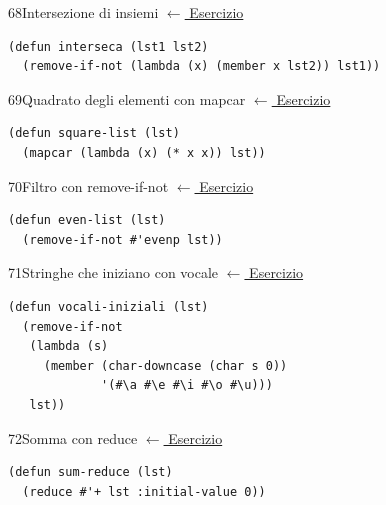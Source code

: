 \label{sol:68}
\begin{solbox}{68}{Intersezione di insiemi}
\small\color{black!55}\hyperref[ex:68]{$\leftarrow$ Esercizio}\normalsize\color{black}
\begin{lstlisting}
(defun interseca (lst1 lst2)
  (remove-if-not (lambda (x) (member x lst2)) lst1))
\end{lstlisting}
\end{solbox}


\label{sol:69}
\begin{solbox}{69}{Quadrato degli elementi con mapcar}
\small\color{black!55}\hyperref[ex:69]{$\leftarrow$ Esercizio}\normalsize\color{black}
\begin{lstlisting}
(defun square-list (lst)
  (mapcar (lambda (x) (* x x)) lst))
\end{lstlisting}
\end{solbox}

\label{sol:70}
\begin{solbox}{70}{Filtro con remove-if-not}
\small\color{black!55}\hyperref[ex:70]{$\leftarrow$ Esercizio}\normalsize\color{black}
\begin{lstlisting}
(defun even-list (lst)
  (remove-if-not #'evenp lst))
\end{lstlisting}
\end{solbox}

\label{sol:71}
\begin{solbox}{71}{Stringhe che iniziano con vocale}
\small\color{black!55}\hyperref[ex:71]{$\leftarrow$ Esercizio}\normalsize\color{black}
\begin{lstlisting}
(defun vocali-iniziali (lst)
  (remove-if-not
   (lambda (s)
     (member (char-downcase (char s 0))
             '(#\a #\e #\i #\o #\u)))
   lst))
\end{lstlisting}
\end{solbox}

\label{sol:72}
\begin{solbox}{72}{Somma con reduce}
\small\color{black!55}\hyperref[ex:72]{$\leftarrow$ Esercizio}\normalsize\color{black}
\begin{lstlisting}
(defun sum-reduce (lst)
  (reduce #'+ lst :initial-value 0))
\end{lstlisting}
\end{solbox}

